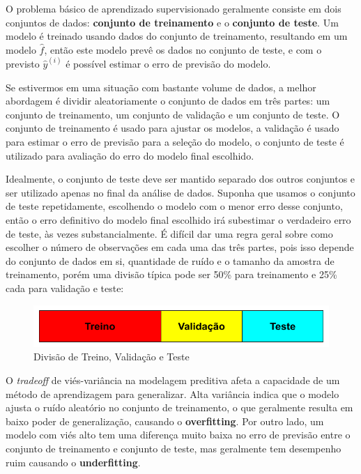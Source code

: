 O problema básico de aprendizado supervisionado geralmente consiste em dois conjuntos de dados: \textbf{conjunto de treinamento} e
o \textbf{conjunto de teste}. Um modelo é treinado usando dados do conjunto de treinamento, resultando em um modelo $\hat{f}$, então este modelo prevê os dados no conjunto de teste, e com o previsto $\hat{y}^{(i)}$ é possível estimar o erro de previsão do modelo.

Se estivermos em uma situação com bastante volume de dados, a melhor abordagem é dividir aleatoriamente o conjunto de dados em três partes: um conjunto de treinamento, um conjunto de validação e um conjunto de teste. O conjunto de treinamento é usado para ajustar os modelos, a validação é usado para estimar o erro de previsão para a seleção do modelo, o conjunto de teste é utilizado para avaliação do erro do modelo final escolhido.

Idealmente, o conjunto de teste deve ser mantido separado dos outros conjuntos e ser utilizado apenas no final da análise de dados. Suponha que usamos o conjunto de teste repetidamente, escolhendo o modelo com o menor erro desse conjunto, então o  erro definitivo do modelo final escolhido irá subestimar o verdadeiro erro de teste, às vezes substancialmente.
É difícil dar uma regra geral sobre como escolher o número de
observações em cada uma das três partes, pois isso depende do conjunto de dados em si, quantidade de ruído e o tamanho da amostra de treinamento, porém uma divisão típica pode
ser 50\% para treinamento e 25\% cada para validação e teste:

\begin{figure}[htb]
 \caption{Divisão de Treino, Validação e Teste}
 \label{fig:treino_test_split}
 \centering
 \includegraphics[scale=0.4]{images/treino_teste_split.png}
\end{figure}


O \textit{tradeoff} de viés-variância \cite{hastie} na modelagem preditiva afeta a capacidade de um método de aprendizagem para generalizar. Alta variância indica que o modelo ajusta o ruído aleatório no conjunto de treinamento, o que geralmente resulta em baixo poder de generalização, causando o \textbf{overfitting}. Por outro lado, um modelo com viés alto tem uma diferença muito baixa no erro de previsão entre o conjunto de treinamento e conjunto de teste, mas geralmente tem desempenho ruim causando o \textbf{underfitting}. 

